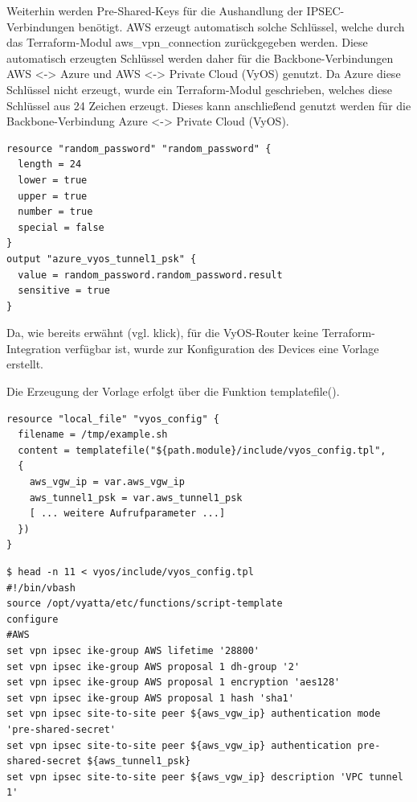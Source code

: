 Weiterhin werden Pre-Shared-Keys für die Aushandlung der IPSEC-Verbindungen benötigt. AWS erzeugt automatisch solche Schlüssel, welche durch das Terraform-Modul \glqq aws\_vpn\_connection\grqq{} zurückgegeben werden. Diese automatisch erzeugten Schlüssel werden daher für die Backbone-Verbindungen AWS <-> Azure und AWS <-> Private Cloud (VyOS) genutzt. Da Azure diese Schlüssel nicht erzeugt, wurde ein Terraform-Modul geschrieben, welches diese Schlüssel aus 24 Zeichen erzeugt. Dieses kann anschließend genutzt werden für die Backbone-Verbindung Azure <-> Private Cloud (VyOS).

\begin{lstlisting}[label=tf-generate-psk,caption=Auf Sonderzeichen (special) wurde verzichtet. Das Modul stellt per output-Anweisung den Schlüssel für andere Terraform-Module zur Verfügung.]
resource "random_password" "random_password" {
  length = 24
  lower = true
  upper = true
  number = true
  special = false
}
output "azure_vyos_tunnel1_psk" {
  value = random_password.random_password.result
  sensitive = true
}
\end{lstlisting}

Da, wie bereits erwähnt (vgl. klick), für die VyOS-Router keine Terraform-Integration verfügbar ist, wurde zur Konfiguration des Devices eine Vorlage erstellt.

Die Erzeugung der Vorlage erfolgt über die Funktion templatefile().

\begin{lstlisting}[label=tf-call-tpl-generation,caption=Die Funktion templatefile() erzeugt aus einer Template-Datei (vyos\_config.tpl) die Datei /tmp/example.sh. Die Template-Datei wird mit den Variablen var.aws\_vgw\_ip und aws\_tunnel1\_psk befüllt.]
resource "local_file" "vyos_config" {
  filename = /tmp/example.sh
  content = templatefile("${path.module}/include/vyos_config.tpl",
  {
    aws_vgw_ip = var.aws_vgw_ip
    aws_tunnel1_psk = var.aws_tunnel1_psk
    [ ... weitere Aufrufparameter ...]
  })
}
\end{lstlisting}

\begin{lstlisting}[label=tf-generate-tpl,caption=Verschiede set-Kommandos werden in ein VyOS-Skript eingebettet (Interpreter: /bin/vbash). Die Variablen in Zeilen 9-12 resultieren aus dem Funktionsaufruf (s.o.).]
$ head -n 11 < vyos/include/vyos_config.tpl
#!/bin/vbash
source /opt/vyatta/etc/functions/script-template
configure
#AWS
set vpn ipsec ike-group AWS lifetime '28800'
set vpn ipsec ike-group AWS proposal 1 dh-group '2'
set vpn ipsec ike-group AWS proposal 1 encryption 'aes128'
set vpn ipsec ike-group AWS proposal 1 hash 'sha1'
set vpn ipsec site-to-site peer ${aws_vgw_ip} authentication mode 'pre-shared-secret'
set vpn ipsec site-to-site peer ${aws_vgw_ip} authentication pre-shared-secret ${aws_tunnel1_psk}
set vpn ipsec site-to-site peer ${aws_vgw_ip} description 'VPC tunnel 1'
\end{lstlisting}

